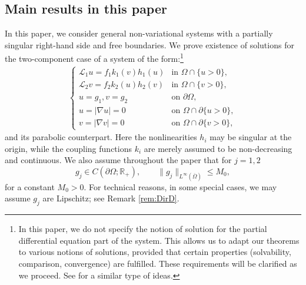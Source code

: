 \documentclass[11pt,oneside,english]{amsart}
\newcommand{\cL}{{\mathcal L}}
\newcommand{\D}{\nabla}
\numberwithin{equation}{section}
\theoremstyle{plain}
\numberwithin{equation}{section}
\begin{document}
\subsection{Main results in this paper}

 
In this paper, we consider general non-variational systems with a partially singular right-hand side and free boundaries. We prove existence of solutions for   the two-component case of a system of the form:\footnote{In this paper, we do not specify the notion of solution for the partial differential equation part of the system. This allows us to adapt our theorems to various notions of solutions, provided that certain properties (solvability, comparison, convergence) are fulfilled. These requirements will be clarified as we proceed. See \cite{AllenKriventsovShahgholian2023} for a similar type of ideas.
}
    \begin{align}\label{eq:sol-2}
        \begin{cases}
            \cL_1 u=f_1k_1(v)h_1(u)&\text{in }\Omega\cap\{u>0\},\\
            \cL_2 v=f_2k_2(u)h_2(v)&\text{in }\Omega\cap\{v>0\},\\
            u=g_1, v=g_2&\text{on }\partial\Omega,\\
            u=|\D u|=0&\text{on }\Omega\cap\partial\{u>0\},\\
            v=|\D v|=0&\text{on }\Omega\cap\partial\{v>0\},
        \end{cases}
    \end{align}
and its parabolic counterpart. Here the nonlinearities $h_i$ may be singular at the origin, while the coupling functions $k_i$ are merely assumed to be non-decreasing and continuous. We also assume throughout the paper that for $j=1,2$
$$
g_j \in C(\partial\Omega; \mathbb{R}_+), \qquad 
\| g_j \|_{L^\infty (\overline \Omega ) } \leq M_0, 
$$
for a constant $M_0 > 0$. For technical reasons, 
in some special cases,  we may assume $g_j$ are Lipschitz; see Remark \ref{rem:DirD}.
\end{document}

